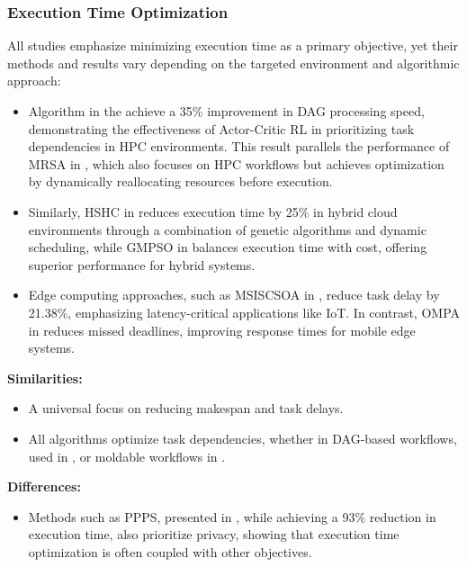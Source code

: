 \documentclass[a4paper, final]{article}
\begin{document}
\subsubsection{Execution Time Optimization}
All studies emphasize minimizing execution time as a primary objective, yet their methods and results vary depending 
on the targeted environment and algorithmic approach:
\begin{itemize}
    \item Algorithm in the \cite{bib:1_acrl} achieve a 35\% improvement in DAG processing speed, demonstrating the effectiveness of 
    Actor-Critic RL in prioritizing task dependencies in HPC environments. This result parallels the performance of MRSA 
    in \cite{bib:8}, which also focuses on HPC workflows but achieves optimization by dynamically reallocating 
    resources before execution.

    \item Similarly, HSHC in \cite{bib:9} reduces execution time by 25\% in hybrid cloud environments through 
    a combination of genetic algorithms and dynamic scheduling, while GMPSO in \cite{bib:10} balances execution
    time with cost, offering superior performance for hybrid systems.

    \item Edge computing approaches, such as MSISCSOA in \cite{bib:3_sandcat}, reduce task delay by 21.38\%, emphasizing 
    latency-critical applications like IoT. In contrast, OMPA in \cite{bib:6_marine} reduces missed deadlines, improving 
    response times for mobile edge systems.
\end{itemize}

\noindent \textbf{Similarities:}
\begin{itemize}
    \item A universal focus on reducing makespan and task delays.
    \item All algorithms optimize task dependencies, whether in DAG-based workflows, used in \cite{bib:1_acrl},
    or moldable workflows in \cite{bib:8}.
\end{itemize}

\noindent \textbf{Differences:}
\begin{itemize}
    \item Methods such as PPPS, presented in \cite{bib:7_ppps}, while achieving a 93\% reduction in execution time, 
    also prioritize privacy, showing that execution time optimization is often coupled with other objectives.
\end{itemize}
\end{document}
